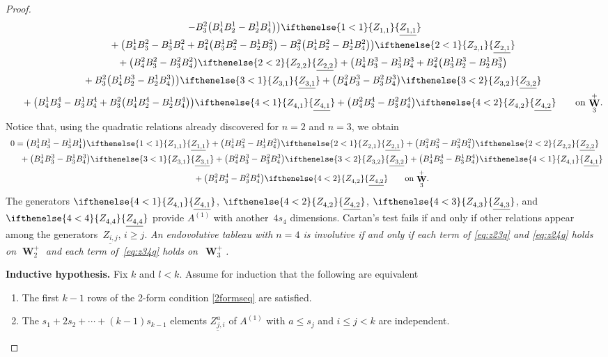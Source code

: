 \documentclass[11pt]{article}
\numberwithin{equation}{section}
\DeclareMathOperator{\Wu}{\mathbf{W}}
\newcommand{\Z}[3]{\ifthenelse{#1<#2}{\ensuremath{Z^{#3}_{#1,#2}}}{\ensuremath{\underline{Z^{#3}_{#1,#2}}}}}
\begin{document}
\begin{proof}
\begin{gather*}
- B^{2}_{3}\big( B^{1}_{4}B^{1}_{2} - B^{1}_{2}B^{1}_{4}\big) \big)
\Z{1}{1}{}\\
 \phantom{0=}{}
+ \big( B^{1}_{4}B^{2}_{3} - B^{1}_{3}B^{2}_{4}
+ B^{2}_{4}\big(B^{1}_{3}B^{2}_{2} - B^{1}_{2}B^{2}_{3}\big)
- B^{2}_{3}\big(B^{1}_{4}B^{2}_{2} - B^{1}_{2}B^{2}_{4}\big)\big)
\Z{2}{1}{}\\
 \phantom{0=}{}
+ \big( B^{2}_{4}B^{2}_{3} - B^{2}_{3}B^{2}_{4}\big)\Z{2}{2}{}
+
\big( B^{1}_{4}B^{3}_{3} - B^{1}_{3}B^{3}_{4}
+ B^{2}_{4}\big( B^{1}_{3}B^{3}_{2} - B^{1}_{2}B^{3}_{3}\big)\\
 \phantom{0=}{}
+ B^{2}_{3}\big( B^{1}_{4}B^{3}_{2} - B^{1}_{2}B^{3}_{4}\big)
\big)\Z{3}{1}{}
+ \big(B^{2}_{4}B^{3}_{3} - B^{2}_{3}B^{3}_{4}\big)\Z{3}{2}{}  \\
 \phantom{0=}{}
+
\big(B^{1}_{4}B^{4}_{3} - B^{1}_{3}B^{4}_{4} + B^{2}_{3}
\big( B^{1}_{4}B^{4}_{2} - B^{1}_{2}B^{4}_{4}\big) \big)\Z{4}{1}{}
+
\big(B^{2}_{4}B^{4}_{3} - B^{2}_{3}B^{4}_{4}\big)\Z{4}{2}{} \qquad \text{on
$\Wu^+_3$}.
\end{gather*}
Notice that, using the quadratic relations already discovered for $n=2$ and
$n=3$, we obtain
\begin{gather}
0=
  \big(B^{1}_{4}B^{1}_{3} - B^{1}_{3}B^{1}_{4}\big)\Z{1}{1}{}
+ \big(B^{1}_{4}B^{2}_{3} - B^{1}_{3}B^{2}_{4}\big)\Z{2}{1}{}
+ \big(B^{2}_{4}B^{2}_{3} - B^{2}_{3}B^{2}_{4}\big)\Z{2}{2}{}
\nonumber\\
\phantom{0=}{}
+ \big(B^{1}_{4}B^{3}_{3} - B^{1}_{3}B^{3}_{4}\big)\Z{3}{1}{}+ \big(B^{2}_{4}B^{3}_{3} - B^{2}_{3}B^{3}_{4}\big)\Z{3}{2}{}
+ \big(B^{1}_{4}B^{4}_{3} - B^{1}_{3}B^{4}_{4}\big)\Z{4}{1}{} \nonumber\\
\phantom{0=}{}
+ \big(B^{2}_{4}B^{4}_{3} - B^{2}_{3}B^{4}_{4}\big)\Z{4}{2}{} \qquad \text{on
$\Wu^+_3$}.
\label{eq:z34q}
\end{gather}
The generators $\Z{4}{1}{}$, $\Z{4}{2}{}$, $\Z{4}{3}{}$, and $\Z{4}{4}{}$ provide
$A^{(1)}$ with another~$4s_4$ dimensions.
Cartan's test fails if and
only if other relations appear among the generators~$\underline{Z_{i,j}}$, $i
\geq j$.
 \emph{An endovolutive tableau with $n=4$ is involutive if and only if
each term of \eqref{eq:z23q} and \eqref{eq:z24q} holds on $\Wu^+_2$ and each term of~\eqref{eq:z34q} holds on~$\Wu^+_3$.}

\textbf{Inductive hypothesis.}
Fix $k$ and $l<k$.
Assume for induction that the following are equivalent
\begin{enumerate}\itemsep=0pt
\item The f\/irst $k-1$ rows of the 2-form condition \eqref{2formseq} are
satisf\/ied.
\item The $s_1 + 2s_2 + \cdots + (k-1)s_{k-1}$ elements $\underline{Z^a_{j,i}}$
of $A^{(1)}$ with $a \leq s_j$ and $i \leq j < k$ are independent.
\end{enumerate}


\end{proof}
\end{document}
